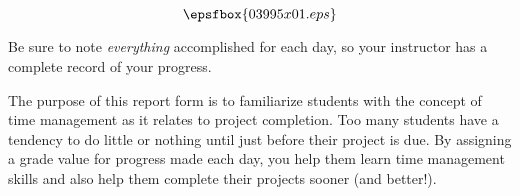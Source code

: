 

$$\epsfbox{03995x01.eps}$$

\vfil \eject






Be sure to note {\it everything} accomplished for each day, so your instructor has a complete record of your progress.







The purpose of this report form is to familiarize students with the concept of time management as it relates to project completion.  Too many students have a tendency to do little or nothing until just before their project is due.  By assigning a grade value for progress made each day, you help them learn time management skills and also help them complete their projects sooner (and better!).




